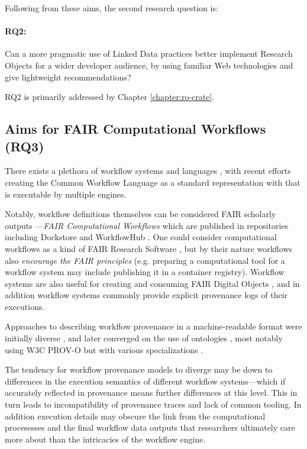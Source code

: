 Following from these aims, the second research question is: 

\paragraph{RQ2:}\label{rq2}  Can a more pragmatic use of Linked Data practices better implement Research Objects for a wider developer audience, by using familiar Web technologies and give lightweight recommendations?

RQ2 is primarily addressed by Chapter \ref{chapter:ro-crate}.


\subsection{Aims for FAIR Computational Workflows (RQ3)}
\label{intro:rq3}

There exists a plethora of \gls{workflow} systems and languages \cite{Leipzig 2021,Amstutz 2021}, with recent efforts creating the Common Workflow Language \cite{Crusoe 2022} as a standard representation with  that is executable by multiple engines. 

Notably, workflow definitions themselves can be considered FAIR scholarly outputs \cite{Goble 2020}---\emph{FAIR Computational Workflows} which are published in repositories including Dockstore \cite{Yuen 2021} and WorkflowHub \cite{Goble 2021}.
One could consider computational workflows as a kind of FAIR Research Software \cite{de Visser 2023}, but by their nature workflows also \emph{encourage the FAIR principles} (e.g. preparing a computational tool for a workflow system \cite{Brack 2022a} may include publishing it in a container registry). Workflow systems are also useful for creating and consuming FAIR Digital Objects \cite{Wittenburg 2022b}, and in addition workflow systems commonly provide explicit provenance logs of their executions.

Approaches to describing workflow provenance in a machine-readable format were initially diverse \cite{Cruz 2009}, and later converged on the use of ontologies \cite{Missier 2010}, most notably using W3C PROV-O \cite{Lebo 2013a} but with various specializations \cite{Garijo 2011,Garijo 2012,Missier 2013,Belhajjame 2015,Cuevas-Vicenttín 2016}. 

The tendency for workflow provenance models to diverge may be down to differences in the execution semantics of different workflow systems---which if accurately reflected in provenance means further differences at this level. This in turn leads to incompatibility of provenance traces and lack of common tooling. In addition execution details may obscure the link from the computational procesesses and the final workflow data outputs that researchers ultimately care more about than the intricacies of the workflow engine.


